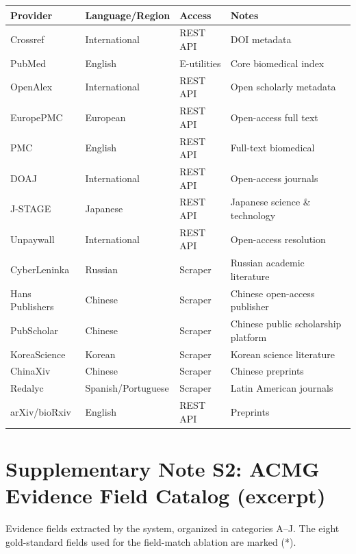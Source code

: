 \documentclass[12pt]{article}
\begin{document}
\begin{center}
  \small
  \begin{tabular}{@{}llll@{}}
    \toprule
    \textbf{Provider} & \textbf{Language/Region} & \textbf{Access} &
    \textbf{Notes} \\
    \midrule
    Crossref & International & REST API & DOI metadata \\
    PubMed & English & E-utilities & Core biomedical index \\
    OpenAlex & International & REST API & Open scholarly metadata \\
    EuropePMC & European & REST API & Open-access full text \\
    PMC & English & REST API & Full-text biomedical \\
    DOAJ & International & REST API & Open-access journals \\
    J-STAGE & Japanese & REST API & Japanese science \& technology \\
    Unpaywall & International & REST API & Open-access resolution \\
    CyberLeninka & Russian & Scraper & Russian academic literature \\
    Hans Publishers & Chinese & Scraper & Chinese open-access publisher \\
    PubScholar & Chinese & Scraper & Chinese public scholarship platform \\
    KoreaScience & Korean & Scraper & Korean science literature \\
    ChinaXiv & Chinese & Scraper & Chinese preprints \\
    Redalyc & Spanish/Portuguese & Scraper & Latin American journals \\
    arXiv/bioRxiv & English & REST API & Preprints \\
    \bottomrule
  \end{tabular}
\end{center}

\section*{Supplementary Note S2: ACMG Evidence Field Catalog (excerpt)}

Evidence fields extracted by the system, organized in categories
A--J. The eight gold-standard fields used for the field-match ablation
are marked (*).
\end{document}
